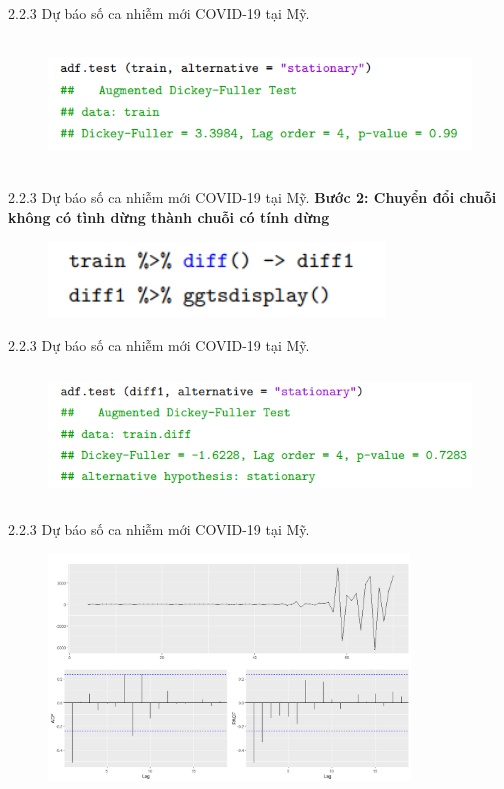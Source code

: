 \documentclass[notheorems,envcountsect,hyperref=unicode]{beamer}
\begin{document}
\begin{frame}{2.2.3 Dự báo số ca nhiễm mới COVID-19 tại Mỹ.}
\begin{figure}[!htb]
	\centering
	\includegraphics[width=1\linewidth,height=3.5cm]{d1} 
\end{figure}
\end{frame}

\begin{frame}{2.2.3 Dự báo số ca nhiễm mới COVID-19 tại Mỹ.}
	\textbf{Bước 2: Chuyển đổi chuỗi không có tình dừng thành chuỗi có tính dừng}
	\begin{figure}[!htb]
		\centering
		\includegraphics[width=1\linewidth,height=2cm]{t2} 
	\end{figure}
\end{frame}

\begin{frame}{2.2.3 Dự báo số ca nhiễm mới COVID-19 tại Mỹ.}
	\begin{figure}[!htb]
		\centering
		\includegraphics[width=1\linewidth,height=3.5cm]{d2} 
	\end{figure}
\end{frame}

\begin{frame}{2.2.3 Dự báo số ca nhiễm mới COVID-19 tại Mỹ.}
	\begin{figure}[!htb]
		\centering
		\includegraphics[width=1\linewidth,height=6cm]{US2} 
	\end{figure}
\end{frame}
\end{document}

